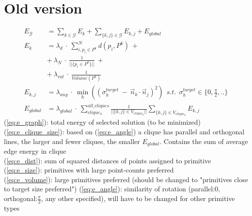 \documentclass[11pt,a3paper]{article}
\begin{document}
\section{Old version}
\begin{align}
	E_{\mathcal{G}} &= \sum_{k \in \mathcal{G}} {E_k} 
				 	 + \sum_{\{k,j\} \in \mathcal{G}}{E_{k,j}}
				 	 + E_{global}
				 	 \label{eq:e_graph}
	\\
%
	E_{k} &= 
		\lambda_{d} ~\cdot~ \sum_{i, p_i \in P^k }^N d(p_i,P^k) ~+ \label{eq:e_dist} \\
		&+~ \lambda_N ~\cdot~ \frac{1}{||\{p_i \in P^k \}||} ~+ 		 \label{eq:e_size} \\
		&+~ \lambda_{vol} ~\cdot~ \frac{1}{Volume(P^k)} 				 \label{eq:e_volume}
	\\
%
	E_{k,j} &= 
		\lambda_{ang} ~\cdot~ \min_h( (\sigma^{target}_h ~-~ \vec{n}_k \cdot \vec{n}_j)^2 ) ~~s.t.~~ \sigma^{target}_h \in \{0,\frac{\pi}{2},..\} \label{eq:e_angle} \\
%
	E_{global} &= \lambda_{global} ~\cdot~ \sum_{clique_h}^{all\_cliques} \frac{1}{||\{k,j\} \in V_{clique_h}||} \sum_{\{k,j\} \in V_{clique_h}} E_{k,j} \label{eq:e_clique_size}
%
\end{align}
(\ref{eq:e_graph}): total energy of selected solution (to be minimized) \\
(\ref{eq:e_clique_size}): based on (\ref{eq:e_angle}) a clique has parallel and orthogonal lines, the larger and fewer cliques, the smaller $E_{global}$. Contains the sum of average edge energy in clique \\
(\ref{eq:e_dist}): sum of squared distances of points assigned to primitive \\
(\ref{eq:e_size}): primitives with large point-counts preferred \\
(\ref{eq:e_volume}): large primitives preferred (should be changed to "primitives close to target size preferred")
(\ref{eq:e_angle}): similarity of rotation (parallel:0, orthogonal:$\frac{\pi}{2}$, any other specified), will have to be changed for other primitive types
\end{document}
